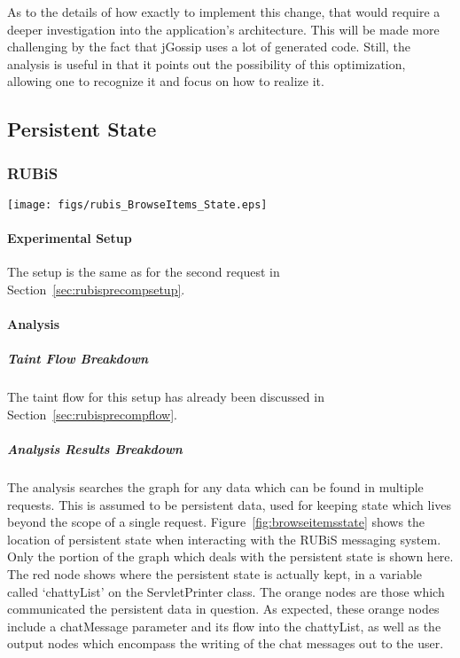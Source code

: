 \documentclass[msc,oneside]{ubcthesis}
\begin{document}
As to the details of how exactly to implement this change, that would require a deeper investigation into the application's architecture. This will be made more challenging by the fact that jGossip uses a lot of generated code. Still, the analysis is useful in that it points out the possibility of this optimization, allowing one to recognize it and focus on how to realize it.

\subsection{Persistent State}
\subsubsection{RUBiS}

\begin{sidewaysfigure}
\centering
\scalebox{0.5}
{\texttt{[image: figs/rubis\_BrowseItems\_State.eps]}}
\caption{RUBiS Browse Items State Analysis Results} 
\label{fig:browseitemsstate}
\end{sidewaysfigure}

\paragraph{Experimental Setup}
The setup is the same as for the second request in Section~\ref{sec:rubisprecompsetup}.

\paragraph{Analysis}
\subparagraph{Taint Flow Breakdown}
The taint flow for this setup has already been discussed in Section~\ref{sec:rubisprecompflow}.

\subparagraph{Analysis Results Breakdown}
The analysis searches the graph for any data which can be found in multiple requests. This is assumed to be persistent data, used for keeping state which lives beyond the scope of a single request. Figure~\ref{fig:browseitemsstate} shows the location of persistent state when interacting with the RUBiS messaging system. Only the portion of the graph which deals with the persistent state is shown here. The red node shows where the persistent state is actually kept, in a variable called `chattyList' on the ServletPrinter class. The orange nodes are those which communicated the persistent data in question. As expected, these  orange nodes include a chatMessage parameter and its flow into the chattyList, as well as the output nodes which encompass the writing of the chat messages out to the user.\\
\end{document}
